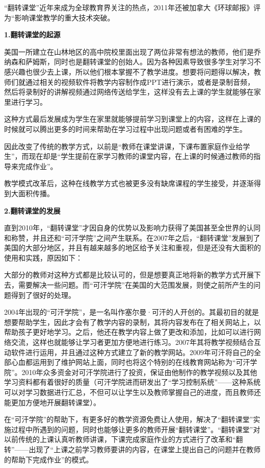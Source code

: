 \documentclass{article}
\begin{document}
“翻转课堂”近年来成为全球教育界关注的热点，2011年还被加拿大《环球邮报》评为“影响课堂教学的重大技术突破。

\textbf{1.翻转课堂的起源}

美国一所建立在山林地区的高中院校里面出现了两位非常有想法的教师，他们是乔纳森和萨姆斯，同时也是翻转课堂的创始人。因为各种因素导致很多学生对学习不感兴趣也很少去上课，所以他们根本掌握不了教学进度。想要将问题得以解决，教师们就通过相关的视频软件将教学内容制作成PPT进行演示，或者是录制音频，然后将录制好的讲解视频通过网络传送给学生，这样没有去上课的学生就能够在家里进行学习。

这种方式最后发展成为学生在家里就能够提前学习到课堂上的内容，这样在上课的时候就可以腾出更多的时间来帮助在学习过程中出现问题或者有困难的学生。

因此改变了传统的教学方式，以前是“教师在课堂讲课，下课布置家庭作业给学生”，而现在却是“学生提前在家学习教师的课堂内容，在上课的时候通过教师的指导来完成作业”。

教学模式改革后，这种在线教学方式也被更多没有缺席课程的学生接受，并逐渐得到大面积传播。

\textbf{2.翻转课堂的发展}

直到2010年，“翻转课堂”才因自身的优势以及影响力获得了美国甚至全世界的认同和称赞，并且还和“可汗学院”之间产生联系。在2007年之后，“翻转课堂”发展到了美国的大部分地区，并且有越来越多的地区给予关注和重视，但是还没有大面积的使用和实践，原因如下：

大部分的教师对这种方式都是比较认可的，但是想要真正地将新的教学方式开展下去，需要解决一些问题。而“可汗学院”在美国的大范围发展，则使之前所产生的问题得到了很好的处理。

2004年出现的“可汗学院”，是一名叫作塞尔曼·可汗的人开创的。其最初目的就是想要帮助学生，因此才会有了教学内容的录制，其将内容发布在了相关网站上，以帮助孩子更好地学习。之后，他还在教学内容上做了更改和添加，比如可以进行网络交流，这样也就能够让学习者更加方便地进行练习。2007年其将教学视频结合互动软件进行运用，并且通过这种方式建立了新的教学网站。2009年可汗将自己的全部心血都运用到了维护网站上面，同时也将这个特别的在线教育网站称为“可汗学院”。2010年众多资金对可汗学院进行了投资，保证由他制作的教学视频以及其他学习资料都有着很好的质量（可汗学院进而研发出了“学习控制系统”——这种系统可以对学习数据进行汇总，不但可以让学生以及教师掌握自己的进度，而且教师还能更加方便地开展翻转课堂）。

在“可汗学院”的帮助下，有更多好的教学资源免费让人使用，解决了“翻转课堂”实施过程中所遇到的问题，同时也能够让更多的教师开展“翻转课堂”。“翻转课堂”对以前传统的上课认真听教师讲课，下课完成家庭作业的方式进行了改革和“翻转”——出现了“上课之前学习教师要讲的内容，在课堂上提出自己的问题并在教师的帮助下完成作业”的模式。
\end{document}
